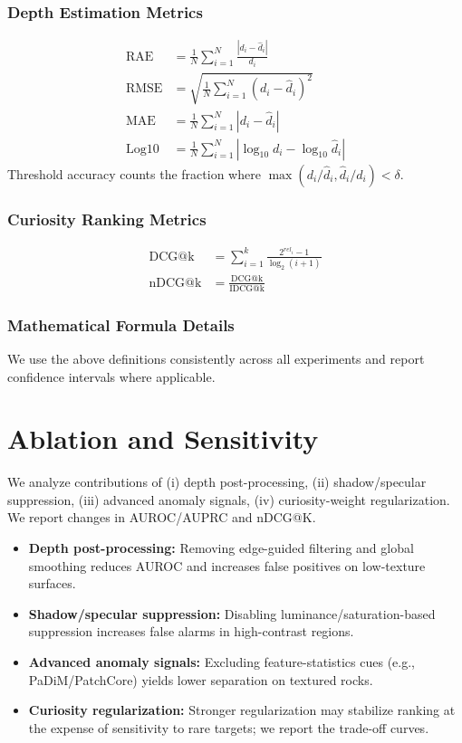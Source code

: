 \documentclass[12pt]{article}
\begin{document}
\subsubsection{Depth Estimation Metrics}
\begin{align}
\mathrm{RAE} &= \frac{1}{N}\sum_{i=1}^N \frac{|d_i-\hat d_i|}{d_i} \\
\mathrm{RMSE} &= \sqrt{\frac{1}{N}\sum_{i=1}^N (d_i-\hat d_i)^2} \\
\mathrm{MAE} &= \frac{1}{N}\sum_{i=1}^N |d_i-\hat d_i| \\
\mathrm{Log10} &= \frac{1}{N}\sum_{i=1}^N |\log_{10} d_i - \log_{10} \hat d_i|
\end{align}
Threshold accuracy counts the fraction where $\max(d_i/\hat d_i, \hat d_i/d_i) < \delta$.

\subsubsection{Curiosity Ranking Metrics}
\begin{align}
\mathrm{DCG@k} &= \sum_{i=1}^{k} \frac{2^{rel_i}-1}{\log_2(i+1)} \\
\mathrm{nDCG@k} &= \frac{\mathrm{DCG@k}}{\mathrm{IDCG@k}}
\end{align}

\subsubsection{Mathematical Formula Details}
We use the above definitions consistently across all experiments and report confidence intervals where applicable.

\section{Ablation and Sensitivity}
We analyze contributions of (i) depth post-processing, (ii) shadow/specular suppression, (iii) advanced anomaly signals, (iv) curiosity-weight regularization. We report changes in AUROC/AUPRC and nDCG@K.
\begin{itemize}
  \item \textbf{Depth post-processing:} Removing edge-guided filtering and global smoothing reduces AUROC and increases false positives on low-texture surfaces.
  \item \textbf{Shadow/specular suppression:} Disabling luminance/saturation-based suppression increases false alarms in high-contrast regions.
  \item \textbf{Advanced anomaly signals:} Excluding feature-statistics cues (e.g., PaDiM/PatchCore) yields lower separation on textured rocks.
  \item \textbf{Curiosity regularization:} Stronger regularization may stabilize ranking at the expense of sensitivity to rare targets; we report the trade-off curves.
\end{itemize}
\end{document}
